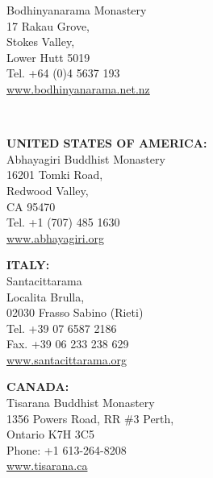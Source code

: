 {\begin{minipage}{0.95\linewidth}
\begin{multicols}{2}
{Bodhinyanarama Monastery\\
17 Rakau Grove,\\
Stokes Valley,\\
Lower Hutt 5019\\
Tel. +64 (0)4 5637 193\\
\href{http://www.bodhinyanarama.net.nz}{www.bodhinyanarama.net.nz}

}

\end{multicols}
\end{minipage}

\clearpage\thispagestyle{empty}

{\chapterfont\mbox{}}

\mbox{}

\mbox{} \\
\mbox{}
\vspace*{\baselineskip}

\begin{minipage}{0.95\linewidth}
\begin{multicols}{2}
\setlength{\parindent}{0pt}
\setlength{\parskip}{1.2em}
\small

{\raggedright

\textbf{UNITED STATES OF AMERICA:} \\
Abhayagiri Buddhist Monastery\\
16201 Tomki Road,\\
Redwood Valley,\\
CA 95470\\
Tel. +1 (707) 485 1630\\
\href{http://www.abhayagiri.org}{www.abhayagiri.org}

\textbf{ITALY:} \\
Santacittarama\\
Localita Brulla,\\
02030 Frasso Sabino (Rieti)\\
Tel. +39 07 6587 2186\\
Fax. +39 06 233 238 629\\
\href{http://www.santacittarama.org}{www.santacittarama.org}

}

\columnbreak

{\raggedright

\textbf{CANADA:} \\
Tisarana Buddhist Monastery\\
1356 Powers Road, RR \#3 Perth,\\
Ontario K7H 3C5\\
Phone: +1 613-264-8208\\
\href{http://www.tisarana.ca}{www.tisarana.ca}

}
\end{multicols}
\end{minipage}}
